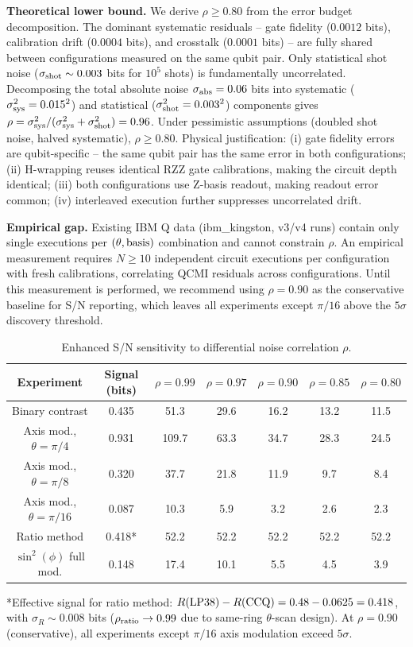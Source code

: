 \documentclass[aps,prl,superscriptaddress,nofootinbib]{revtex4-2}
\begin{document}
\textbf{Theoretical lower bound.} We derive $\rho \geq 0.80$ from the error budget decomposition. The dominant systematic residuals -- gate fidelity ($0.0012$ bits), calibration drift ($0.0004$ bits), and crosstalk ($0.0001$ bits) -- are fully shared between configurations measured on the same qubit pair. Only statistical shot noise ($\sigma_{\rm shot} \sim 0.003$ bits for $10^5$ shots) is fundamentally uncorrelated. Decomposing the total absolute noise $\sigma_{\rm abs} = 0.06$ bits into systematic ($\sigma_{\rm sys}^2 = 0.015^2$) and statistical ($\sigma_{\rm shot}^2 = 0.003^2$) components gives $\rho = \sigma_{\rm sys}^2/(\sigma_{\rm sys}^2 + \sigma_{\rm shot}^2) = 0.96$. Under pessimistic assumptions (doubled shot noise, halved systematic), $\rho \geq 0.80$. Physical justification: (i) gate fidelity errors are qubit-specific -- the same qubit pair has the same error in both configurations; (ii) H-wrapping reuses identical RZZ gate calibrations, making the circuit depth identical; (iii) both configurations use Z-basis readout, making readout error common; (iv) interleaved execution further suppresses uncorrelated drift.

\textbf{Empirical gap.} Existing IBM Q data (ibm\_kingston, v3/v4 runs) contain only single executions per $(\theta, {\rm basis})$ combination and cannot constrain $\rho$. An empirical measurement requires $N \geq 10$ independent circuit executions per configuration with fresh calibrations, correlating QCMI residuals across configurations. Until this measurement is performed, we recommend using $\rho = 0.90$ as the conservative baseline for S/N reporting, which leaves all experiments except $\pi/16$ above the $5\sigma$ discovery threshold.

\begin{table}[h]
\caption{Enhanced S/N sensitivity to differential noise correlation $\rho$.}
\label{tab:snr2}
\begin{ruledtabular}
\begin{tabular}{ccccccc}
Experiment & Signal (bits) & $\rho=0.99$ & $\rho=0.97$ & $\rho=0.90$ & $\rho=0.85$ & $\rho=0.80$ \\
\hline
Binary contrast & 0.435 & 51.3 & 29.6 & 16.2 & 13.2 & 11.5 \\
Axis mod., $\theta=\pi/4$ & 0.931 & 109.7 & 63.3 & 34.7 & 28.3 & 24.5 \\
Axis mod., $\theta=\pi/8$ & 0.320 & 37.7 & 21.8 & 11.9 & 9.7 & 8.4 \\
Axis mod., $\theta=\pi/16$ & 0.087 & 10.3 & 5.9 & 3.2 & 2.6 & 2.3 \\
Ratio method & 0.418* & 52.2 & 52.2 & 52.2 & 52.2 & 52.2 \\
$\sin^2(\phi)$ full mod. & 0.148 & 17.4 & 10.1 & 5.5 & 4.5 & 3.9 \\
\end{tabular}
\end{ruledtabular}
*Effective signal for ratio method: $R({\rm LP38}) - R({\rm CCQ}) = 0.48 - 0.0625 = 0.418$, with $\sigma_R \sim 0.008$ bits ($\rho_{\rm ratio} \to 0.99$ due to same-ring $\theta$-scan design). At $\rho=0.90$ (conservative), all experiments except $\pi/16$ axis modulation exceed $5\sigma$.
\end{table}
\end{document}
